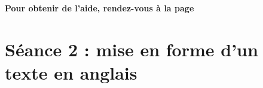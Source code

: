 \begin{center}\label{modelePage5e1}\end{center}

\textbf{Pour obtenir de l'aide, rendez-vous à la page \pageref{aide_seancesWord}}















%
%
%
%


\newpage

\section{Séance 2 : mise en forme d'un texte en anglais}\label{ficheTexte5e2}

